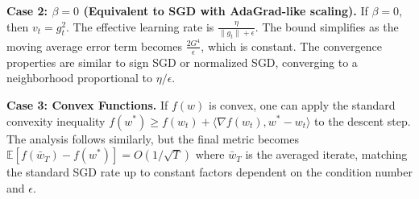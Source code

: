 \documentclass{article}
\begin{document}
\textbf{Case 2: $\beta = 0$ (Equivalent to SGD with AdaGrad-like scaling).} If $\beta = 0$, then $v_t = g_t^2$. The effective learning rate is $\frac{\eta}{\|g_t\| + \epsilon}$. The bound simplifies as the moving average error term becomes $\frac{2G^4}{\epsilon}$, which is constant. The convergence properties are similar to sign SGD or normalized SGD, converging to a neighborhood proportional to $\eta/\epsilon$.

\textbf{Case 3: Convex Functions.} If $f(w)$ is convex, one can apply the standard convexity inequality $f(w^*) \geq f(w_t) + \langle \nabla f(w_t), w^* - w_t \rangle$ to the descent step. The analysis follows similarly, but the final metric becomes $\mathbb{E}[f(\bar{w}_T) - f(w^*)] = O(1/\sqrt{T})$ where $\bar{w}_T$ is the averaged iterate, matching the standard SGD rate up to constant factors dependent on the condition number and $\epsilon$.
\end{document}
